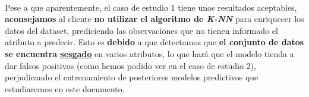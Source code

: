 \paragraph{}
Pese a que aparentemente, el caso de estudio 1 tiene unos resultados aceptables, \textbf{aconsejamos} al cliente \textbf{no utilizar el algoritmo de \textit{K-NN}} para enriquecer los datos del dataset, prediciendo las observaciones que no tienen informado el atributo a predecir. Esto es \textbf{debido} a que detectamos que \textbf{el conjunto de datos se encuentra \hyperref[resultados:knn_caracteristicas]{sesgado}} en varios atributos, lo que hará que el modelo tienda a dar falsos positivos (como hemos podido ver en el caso de estudio 2), perjudicando el entrenamiento de posteriores modelos predictivos que estudiaremos en este documento.